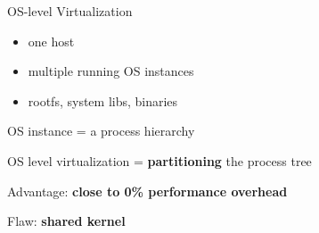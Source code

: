 \begin{frame}{OS-level Virtualization}
	\begin{itemize}
	\item one host
	\item multiple running OS instances
	\item rootfs, system libs, binaries
	\end{itemize}
	
	OS instance = a process hierarchy
	
	OS level virtualization = \textbf{partitioning} the process tree
	
	Advantage: \textbf{close to 0\% performance overhead}
	
	Flaw: \textbf{shared kernel}
\end{frame}